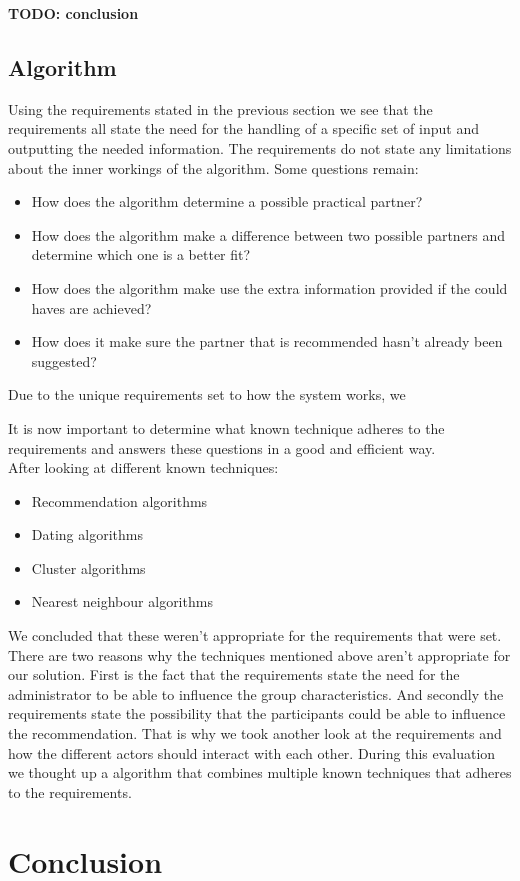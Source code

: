 \documentclass[]{article}
\newcommand{\TODO}[1]{{\color{red}\textbf{TODO: #1}}}
\begin{document}
\TODO{conclusion}

\subsection{Algorithm}
Using the requirements stated in the previous section we see that the requirements all state the need for the handling of a specific set of input and outputting the needed information.
The requirements do not state any limitations about the inner workings of the algorithm.
Some questions remain:
\begin{itemize}
\item How does the algorithm determine a possible practical partner?
\item How does the algorithm make a difference between two possible partners and determine which one is a better fit?
\item How does the algorithm make use the extra information provided if the could haves are achieved?
\item How does it make sure the partner that is recommended hasn't already been suggested?
\end{itemize}
Due to the unique requirements set to how the system works, we 

It is now important to determine what known technique adheres to the requirements and answers these questions in a good and efficient way.\\

After looking at different known techniques:
\begin{itemize}
\item Recommendation algorithms
\item Dating algorithms
\item Cluster algorithms
\item Nearest neighbour algorithms
\end{itemize}

We concluded that these weren't appropriate for the requirements that were set.
There are two reasons why the techniques mentioned above aren't appropriate for our solution.
First is the fact that the requirements state the need for the administrator to be able to influence the group characteristics.
And secondly the requirements state the possibility that the participants could be able to influence the recommendation.
That is why we took another look at the requirements and how the different actors should interact with each other.
During this evaluation we thought up a algorithm that combines multiple known techniques that adheres to the requirements.


\section{Conclusion}

\newpage


\end{document}
